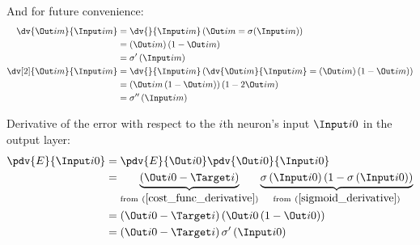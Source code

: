 And for future convenience: 
\begin{align}
\dv{\Out i m}{\Input i m} &= 
\dv{}{\Input i m}\left({\Out i m} = \sigma(\Input i m)\right) 
\\
&= \left(\Out i m\right)\left(1 - \Out i m\right)
\\
&= \sigma^{\prime}\left(\Input i m\right)
\\
\dv[2]{{\Out i m}}{{\Input i m}} &=
\dv{}{{\Input i m}}\left(\dv{\Out i m}{\Input i m} = \left(\Out i m\right)\left(1 - \Out i m\right)\right)
\\
&= \left(\Out i m\left(1 - \Out i m\right)\right)\left(1 - 2\Out i m\right)
\\
&= \sigma^{\prime\prime}\left(\Input i m\right)
\end{align}

Derivative of the error with respect to the $i$th neuron's input $\Input i 0$ in the output layer:
\begin{align}
\pdv{E}{\Input i 0} &= \pdv{E}{\Out i 0} \pdv{\Out i 0}{\Input i 0} 
\\
&= \underbrace{\left(\Out i 0 - \Target i\right)}_{\text{from} \ (\ref{cost_func_derivative})} \underbrace{\sigma\left(\Input i 0\right)\left(1 - \sigma\left(\Input i 0\right)\right)}
_{\text{from} \ (\ref{sigmoid_derivative})}
\\
&= \left(\Out i 0 - \Target i\right)\left(\Out i 0 \left(1 - \Out i 0\right)\right)
\\
&= \left(\Out i 0 - \Target i\right)\sigma^{\prime}\left(\Input i 0\right)\label{dedx}
\end{align}

